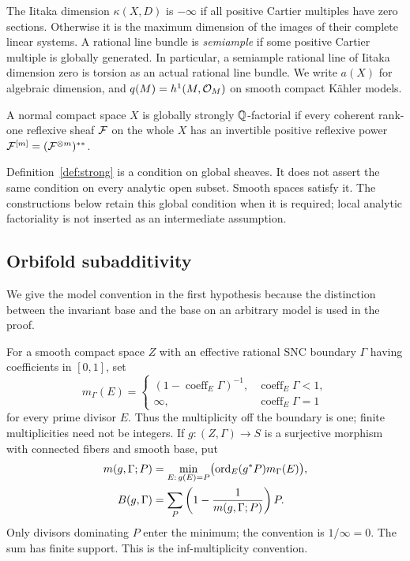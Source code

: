 The Iitaka dimension \(\kappa(X,D)\) is \(-\infty\) if all positive
Cartier multiples have zero sections. Otherwise it is the maximum
dimension of the images of their complete linear systems. A rational
line bundle is \emph{semiample} if some positive Cartier multiple is
globally generated. In particular, a semiample rational line of Iitaka
dimension zero is torsion as an actual rational line bundle.
We write \(a(X)\) for algebraic dimension, and
\(q(M)=h^1(M,\mathcal{O}_M)\) on smooth compact K\"ahler models.

\begin{definition}
\label{def:strong}
A normal compact space \(X\) is globally strongly
\(\mathbb{Q}\)-factorial if every coherent rank-one reflexive sheaf
\(\mathcal{F}\) on the whole \(X\) has an invertible positive reflexive
power \(\mathcal{F}^{[m]}=(\mathcal{F}^{\otimes m})^{**}\).
\end{definition}

Definition~\ref{def:strong} is a condition on global sheaves. It does
not assert the same condition on every analytic open subset. Smooth
spaces satisfy it. The constructions below retain this global
condition when it is required; local analytic factoriality is not
inserted as an intermediate assumption.

\subsection{Orbifold subadditivity}

We give the model convention in the first hypothesis because the
distinction between the invariant base and the base on an arbitrary
model is used in the proof.

For a smooth compact space \(Z\) with an effective rational SNC
boundary \(\Gamma\) having coefficients in \([0,1]\), set
\[
 m_\Gamma(E)=
 \begin{cases}
 (1-\operatorname{coeff}_E\Gamma)^{-1},&
                  \operatorname{coeff}_E\Gamma<1,\\
 \infty,&\operatorname{coeff}_E\Gamma=1
 \end{cases}
\]
for every prime divisor \(E\). Thus the multiplicity off the boundary
is one; finite multiplicities need not be integers. If
\(g:(Z,\Gamma)\to S\) is a surjective morphism with connected
fibers and smooth base, put
\begin{equation}\label{eq:orbifold-base}
 \begin{split}
 m(g,\Gamma;P)&=
   \min_{E:\,g(E)=P}\bigl(\operatorname{ord}_E(g^*P)m_\Gamma(E)\bigr),\\
 B(g,\Gamma)&=\sum_P\left(1-\frac1{m(g,\Gamma;P)}\right)P.
 \end{split}
\end{equation}
Only divisors dominating \(P\) enter the minimum; the convention is
\(1/\infty=0\). The sum has finite support. This is the
inf-multiplicity convention.

